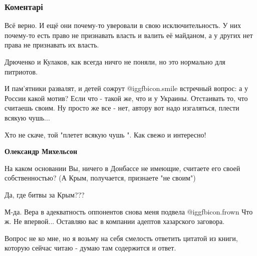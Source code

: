  
 
 
 
 
\subsubsection{Коментарі}

\begin{itemize} %

Всё верно. И ещё они почему-то уверовали в свою исключительность. У них
почему-то есть право не признавать власть и валить её майданом, а у других нет
права не признавать их власть.

Дрюченко и Кулаков, как всегда ничго не поняли, но это нормально для питриотов.


И пам'ятники развалят, и детей сожрут  @igg{fbicon.smile}  встречный вопрос: а у России какой
мотив? Если что - такой же, что и у Украины. Отстаивать то, что считаешь своим.
Ну просто же все - нет, автору вот надо изгаляться, плести всякую чушь...

\begin{itemize} %
Хто не скаче, той "плетет всякую чушь ".
Как свежо и интересно!

\textbf{Олександр Михельсон}

На каком основании Вы, ничего в Донбассе не имеющие, считаете его своей собственностью?
(А Крым, получается, признаете "не своим")

Да, где битвы за Крым???


М-да. Вера в адекватность оппонентов снова меня подвела  @igg{fbicon.frown}
Что ж. Не впервой... Оставляю вас в компании адептов хазарского заговора.
\end{itemize} %


Вопрос не ко мне, но я возьму на себя смелость ответить цитатой из книги,
которую сейчас читаю - думаю там содержится и ответ.


\end{itemize}
